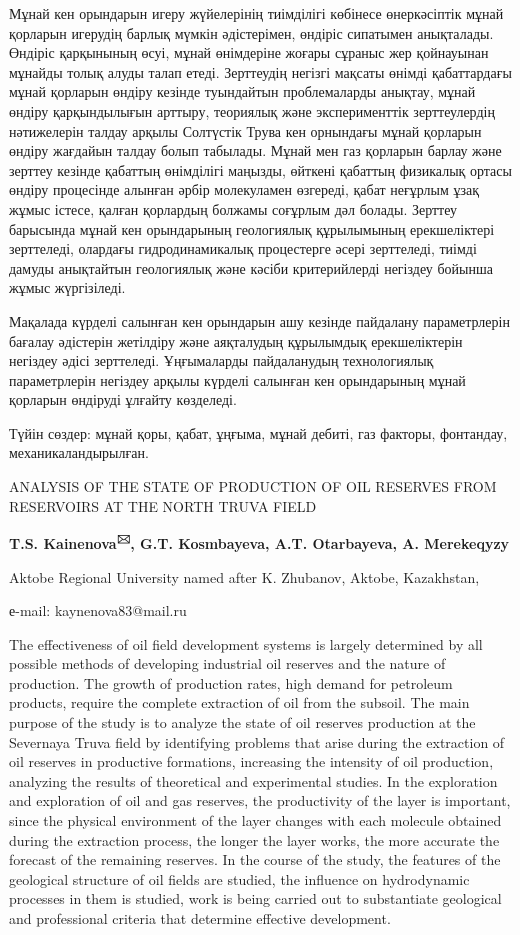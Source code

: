 Мұнай кен орындарын игеру жүйелерінің тиімділігі көбінесе өнеркәсіптік
мұнай қорларын игерудің барлық мүмкін әдістерімен, өндіріс сипатымен
анықталады. Өндіріс қарқынының өсуі, мұнай өнімдеріне жоғары сұраныс жер
қойнауынан мұнайды толық алуды талап етеді. Зерттеудің негізгі мақсаты
өнімді қабаттардағы мұнай қорларын өндіру кезінде туындайтын
проблемаларды анықтау, мұнай өндіру қарқындылығын арттыру, теориялық
және эксперименттік зерттеулердің нәтижелерін талдау арқылы Солтүстік
Трува кен орнындағы мұнай қорларын өндіру жағдайын талдау болып
табылады. Мұнай мен газ қорларын барлау және зерттеу кезінде қабаттың
өнімділігі маңызды, өйткені қабаттың физикалық ортасы өндіру процесінде
алынған әрбір молекуламен өзгереді, қабат неғұрлым ұзақ жұмыс істесе,
қалған қорлардың болжамы соғұрлым дәл болады. Зерттеу барысында мұнай
кен орындарының геологиялық құрылымының ерекшеліктері зерттеледі,
олардағы гидродинамикалық процестерге әсері зерттеледі, тиімді дамуды
анықтайтын геологиялық және кәсіби критерийлерді негіздеу бойынша жұмыс
жүргізіледі.

Мақалада күрделі салынған кен орындарын ашу кезінде пайдалану
параметрлерін бағалау әдістерін жетілдіру және аяқталудың құрылымдық
ерекшеліктерін негіздеу әдісі зерттеледі. Ұңғымаларды пайдаланудың
технологиялық параметрлерін негіздеу арқылы күрделі салынған кен
орындарының мұнай қорларын өндіруді ұлғайту көзделеді.

Түйін сөздер: мұнай қоры, қабат, ұңғыма, мұнай дебиті, газ факторы,
фонтандау, механикаландырылған.

ANALYSIS OF THE STATE OF PRODUCTION OF OIL RESERVES FROM RESERVOIRS AT
THE NORTH TRUVA FIELD

{\bfseries T.S. Kainenova\textsuperscript{🖂}, G.T. Kosmbayeva, A.T.
Otarbayeva, A. Merekeqyzy}

Aktobe Regional University named after K. Zhubanov, Aktobe, Kazakhstan,

е-mail: kaynenova83@mail.ru

The effectiveness of oil field development systems is largely determined
by all possible methods of developing industrial oil reserves and the
nature of production. The growth of production rates, high demand for
petroleum products, require the complete extraction of oil from the
subsoil. The main purpose of the study is to analyze the state of oil
reserves production at the Severnaya Truva field by identifying problems
that arise during the extraction of oil reserves in productive
formations, increasing the intensity of oil production, analyzing the
results of theoretical and experimental studies. In the exploration and
exploration of oil and gas reserves, the productivity of the layer is
important, since the physical environment of the layer changes with each
molecule obtained during the extraction process, the longer the layer
works, the more accurate the forecast of the remaining reserves. In the
course of the study, the features of the geological structure of oil
fields are studied, the influence on hydrodynamic processes in them is
studied, work is being carried out to substantiate geological and
professional criteria that determine effective development.

